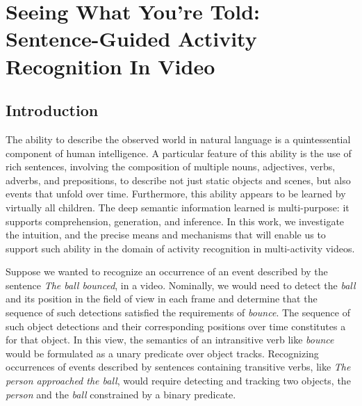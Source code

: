 \chapter{Seeing What You're Told:\\ Sentence-Guided Activity Recognition In Video}

\section{Introduction}
\label{sec:introduction}
\vspace*{-2ex}
The ability to describe the observed world in natural language is a
quintessential component of human intelligence.
%
A particular feature of this ability is the use of rich sentences, involving
the composition of multiple nouns, adjectives, verbs, adverbs, and
prepositions, to describe not just static objects and scenes, but also events
that unfold over time.
%
Furthermore, this ability appears to be learned by virtually all children.
%
The deep semantic information learned is multi-purpose: it supports
comprehension, generation, and inference.
%
In this work, we investigate the intuition, and the precise means and
mechanisms that will enable us to support such ability in the domain of
activity recognition in multi-activity videos.

Suppose we wanted to recognize an occurrence of an event described by the
sentence \emph{The ball bounced}, in a video.
%
Nominally, we would need to detect the \emph{ball} and its position in the
field of view in each frame and determine that the sequence of such detections
satisfied the requirements of \emph{bounce}.
%
The sequence of such object detections and their corresponding positions over
time constitutes a  for that object.
%
In this view, the semantics of an intransitive verb like \emph{bounce} would be
formulated as a unary predicate over object tracks.
%
Recognizing occurrences of events described by sentences containing transitive
verbs, like \emph{The person approached the ball}, would require detecting and
tracking two objects, the \emph{person} and the \emph{ball} constrained by a
binary predicate.


